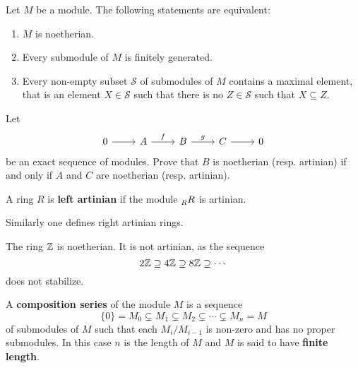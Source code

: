 \begin{exercise}
    Let $M$ be a module. The following statements are equivalent:
    \begin{enumerate}
        \item $M$ is noetherian.
        \item Every submodule of $M$ is finitely generated. 
        \item Every non-empty subset $\mathcal{S}$ of submodules of $M$ contains a maximal element, that is
            an element $X\in\mathcal{S}$ such that there is no $Z\in\mathcal{S}$ such that $X\subseteq Z$.  
    \end{enumerate}
\end{exercise}

\begin{exercise}
\label{xca:AN_exact}
	Let 
	\[
	\begin{tikzcd}
		0 \arrow{r}
		& A \arrow{r}{f}
		& B \arrow{r}{g}
		& C \arrow{r}
		& 0
	\end{tikzcd}
	\]
	be an exact sequence of modules. Prove that $B$ is noetherian (resp.
	artinian) if and only if $A$ and $C$ are noetherian (resp. artinian).
\end{exercise}


\begin{definition}
	A ring $R$ is \textbf{left artinian} if the module 
	$\prescript{}{R}R$ is artinian.
\end{definition}

Similarly one defines right artinian rings. 

\begin{example}
	The ring $\mathbb{Z}$ is noetherian. It is not artinian, as the sequence
	\[
	2\mathbb{Z}\supseteq
	4\mathbb{Z}\supseteq 8\mathbb{Z}\supseteq\cdots
	\]
	does not stabilize. 
\end{example}

\begin{definition}
	\label{def:serie_de_composicion}
	A \textbf{composition series} of the module $M$ is a sequence 
	\[
		\{0\}=M_0\subsetneq M_1\subsetneq M_2\subsetneq\cdots\subsetneq M_n=M
	\]
	of submodules of $M$ such that each $M_i/M_{i-1}$ is non-zero and has no proper submodules. 
	In this case 
	$n$ is the length of $M$ and $M$ is said to have \textbf{finite length}.
\end{definition}

